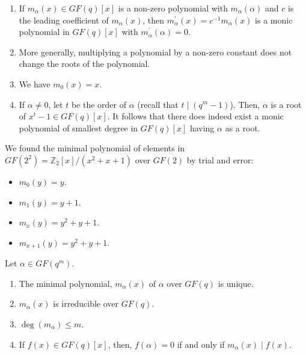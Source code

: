 \begin{Remark}{}{}
    \begin{enumerate}[label=(\arabic*)]
        \item If $ m_\alpha(x)\in GF(q)[x] $ is a non-zero polynomial with $ m_\alpha(\alpha) $
              and $ c $ is the leading coefficient of $ m_\alpha(x) $, then
              $ m_\alpha^\prime(x)=c^{-1}m_\alpha(x) $ is a monic polynomial in $ GF(q)[x] $
              with $ m_\alpha^\prime(\alpha)=0 $.
        \item More generally, multiplying a polynomial by a non-zero constant does not change
              the roots of the polynomial.
        \item We have $ m_0(x)=x $.
        \item If $ \alpha\neq 0 $, let $ t $ be the order of $ \alpha $
              (recall that $ t\mid (q^m-1) $). Then, $ \alpha $ is a root of $ x^t-1\in GF(q)[x] $.
              It follows that there does indeed exist a monic polynomial of smallest degree in $ GF(q)[x] $
              having $ \alpha $ as a root.
    \end{enumerate}
\end{Remark}

\begin{Example}{}{}
    We found the minimal polynomial of elements in $ GF(2^2)=\mathbb{Z}_2[x]/(x^2+x+1) $
    over $ GF(2) $ by trial and error:
    \begin{itemize}
        \item $ m_0(y)=y $.
        \item $ m_1(y)=y+1 $.
        \item $ m_x(y)=y^2+y+1 $.
        \item $ m_{x+1}(y)=y^2+y+1 $.
    \end{itemize}
\end{Example}

\begin{Theorem}{}{}
    Let $ \alpha\in GF(q^m) $.
    \begin{enumerate}[label=(\roman*)]
        \item The minimal polynomial, $ m_\alpha(x) $ of $ \alpha $
              over $ GF(q) $ is unique.
        \item $ m_\alpha(x) $ is irreducible over $ GF(q) $.
        \item $ \deg(m_\alpha)\leqslant m $.
        \item If $ f(x)\in GF(q)[x] $, then, $ f(\alpha)=0 $ if and only
              if $ m_\alpha(x)\mid f(x) $.
    \end{enumerate}
\end{Theorem}

